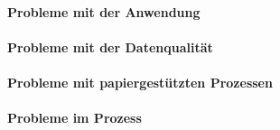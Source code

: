 


\paragraph{Probleme mit der Anwendung}

\paragraph{Probleme mit der Datenqualität}

\paragraph{Probleme mit papiergestützten Prozessen}

\paragraph{Probleme im Prozess}


